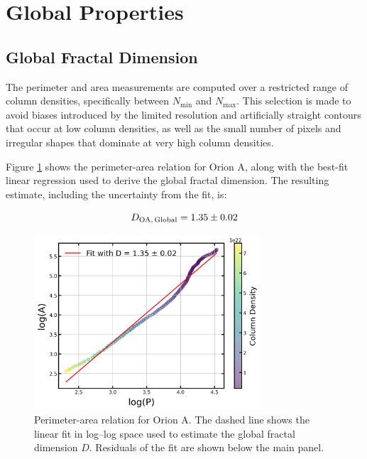 \section{Global Properties}

\subsection{Global Fractal Dimension}

The perimeter and area measurements are computed over a restricted range of column densities, specifically between $N_\mathrm{min}$ and $N_\mathrm{max}$. This selection is made to avoid biases introduced by the limited resolution and artificially straight contours that occur at low column densities, as well as the small number of pixels and irregular shapes that dominate at very high column densities.

Figure \ref{fig:orion_A_global} shows the perimeter-area relation for Orion A, along with the best-fit linear regression used to derive the global fractal dimension. The resulting estimate, including the uncertainty from the fit, is:

\begin{equation}
    \notag
    D_{\mathrm{OA,\,Global}} = 1.35 \pm 0.02
\end{equation}

\begin{figure}[t]
    \centering
    \includegraphics[width=0.75\textwidth]{figures/orion_A_global.png}
    \caption{Perimeter-area relation for Orion A. The dashed line shows the linear fit in log--log space used to estimate the global fractal dimension $D$. Residuals of the fit are shown below the main panel.}
    \label{fig:orion_A_global}
\end{figure}

